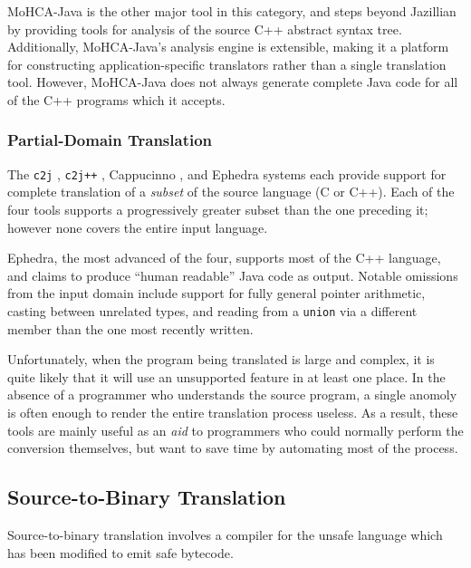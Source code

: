 \documentclass{acmconf}
\begin{document}
MoHCA-Java \cite{mohca} is the other major tool in this category, and
steps beyond Jazillian by providing tools for analysis of the source
C++ abstract syntax tree.  Additionally, MoHCA-Java's analysis engine
is extensible, making it a platform for constructing
application-specific translators rather than a single translation
tool.  However, MoHCA-Java does not always generate complete Java code
for all of the C++ programs which it accepts.

\subsubsection{Partial-Domain Translation}

The {\tt c2j} \cite{c2j}, {\tt c2j++} \cite{c2jpp}, Cappucinno
\cite{capp}, and Ephedra \cite{ephedra} systems each provide support
for complete translation of a {\it subset} of the source language (C
or C++).  Each of the four tools supports a progressively greater
subset than the one preceding it; however none covers the entire input
language.

Ephedra, the most advanced of the four, supports most of the C++
language, and claims to produce ``human readable'' Java code as
output.  Notable omissions from the input domain include support for
fully general pointer arithmetic, casting between unrelated types, and
reading from a {\tt union} via a different member than the one most
recently written.

Unfortunately, when the program being translated is large and complex,
it is quite likely that it will use an unsupported feature in at least
one place.  In the absence of a programmer who understands the source
program, a single anomoly is often enough to render the entire
translation process useless.  As a result, these tools are mainly
useful as an {\it aid} to programmers who could normally perform the
conversion themselves, but want to save time by automating most of the
process.


\subsection{Source-to-Binary Translation}

Source-to-binary translation involves a compiler for the unsafe
language which has been modified to emit safe bytecode.
\end{document}
